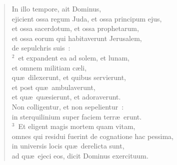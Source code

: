 \begin{flushleft}\begin{verse}\vspace{-19pt}In illo tempore, ait Dominus,\\ ejicient ossa regum Juda, et ossa principum ejus,\\ et ossa sacerdotum, et ossa prophetarum,\\ et ossa eorum qui habitaverunt Jerusalem,\\ de sepulchris suis~:\\
${}^{2}$~et expandent ea ad solem, et lunam,\\ et omnem militiam c\ae li,\\ qu\ae\ dilexerunt, et quibus servierunt,\\ et post qu\ae\ ambulaverunt,\\ et qu\ae\ qu\ae sierunt, et adoraverunt.\\ Non colligentur, et non sepelientur~:\\ in sterquilinium super faciem terr\ae\ erunt.\\
${}^{3}$~Et eligent magis mortem quam vitam,\\ omnes qui residui fuerint de cognatione hac pessima,\\ in universis locis qu\ae\ derelicta sunt,\\ ad qu\ae\ ejeci eos, dicit Dominus exercituum.\end{verse}\end{flushleft}


